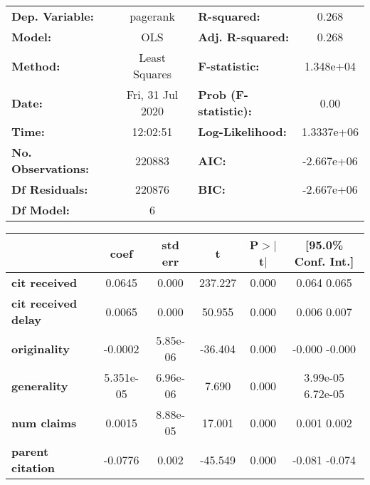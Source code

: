 \begin{center}
\begin{tabular}{lclc}
\toprule
\textbf{Dep. Variable:}     &     pagerank     & \textbf{  R-squared:         } &       0.268    \\
\textbf{Model:}             &       OLS        & \textbf{  Adj. R-squared:    } &       0.268    \\
\textbf{Method:}            &  Least Squares   & \textbf{  F-statistic:       } &   1.348e+04    \\
\textbf{Date:}              & Fri, 31 Jul 2020 & \textbf{  Prob (F-statistic):} &       0.00     \\
\textbf{Time:}              &     12:02:51     & \textbf{  Log-Likelihood:    } &   1.3337e+06   \\
\textbf{No. Observations:}  &      220883      & \textbf{  AIC:               } &   -2.667e+06   \\
\textbf{Df Residuals:}      &      220876      & \textbf{  BIC:               } &   -2.667e+06   \\
\textbf{Df Model:}          &           6      & \textbf{                     } &                \\
\bottomrule
\end{tabular}
\begin{tabular}{lccccc}
                            & \textbf{coef} & \textbf{std err} & \textbf{t} & \textbf{P$>$$|$t$|$} & \textbf{[95.0\% Conf. Int.]}  \\
\midrule
\textbf{cit received}       &       0.0645  &        0.000     &   237.227  &         0.000        &         0.064     0.065       \\
\textbf{cit received delay} &       0.0065  &        0.000     &    50.955  &         0.000        &         0.006     0.007       \\
\textbf{originality}        &      -0.0002  &     5.85e-06     &   -36.404  &         0.000        &        -0.000    -0.000       \\
\textbf{generality}         &    5.351e-05  &     6.96e-06     &     7.690  &         0.000        &      3.99e-05  6.72e-05       \\
\textbf{num claims}         &       0.0015  &     8.88e-05     &    17.001  &         0.000        &         0.001     0.002       \\
\textbf{parent citation}    &      -0.0776  &        0.002     &   -45.549  &         0.000        &        -0.081    -0.074       \\

\end{tabular}
\end{center}

